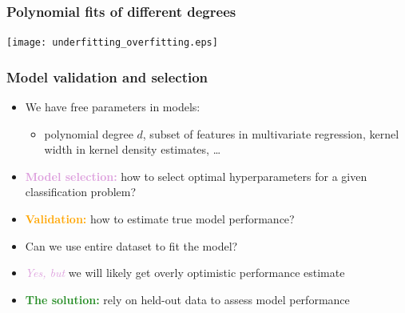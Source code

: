\documentclass[usenames,dvipsnames,aspectratio=169]{beamer}
\begin{document}
\begin{frame}
\frametitle{Polynomial fits of different degrees}

\begin{center}
    \texttt{[image: underfitting\_overfitting.eps]}
\end{center}

\end{frame}









\begin{frame}
\frametitle{Model validation and selection}

\begin{itemize}

  \item We have free parameters in models:
  \begin{itemize}
    \normalsize
    \pause
    \item polynomial degree $d$, 
    subset of features in multivariate regression, 
    kernel width in kernel density estimates, \ldots
  \end{itemize}

  \pause
  \item \textcolor{Plum}{\textbf{Model selection:}} how to select optimal
  hyperparameters for a given classification problem?

  \pause
  \item \textcolor{orange}{\textbf{Validation:}} how to estimate true model performance?

  \pause
  \item Can we use entire dataset to fit the model?

  \pause
  \item \textcolor{Plum}{\textit{Yes, but}} we will likely get overly optimistic performance estimate

  \pause
  \item \textcolor{ForestGreen}{\textbf{The solution:}} rely on held-out data to assess model performance

\end{itemize}

\end{frame}
\end{document}
